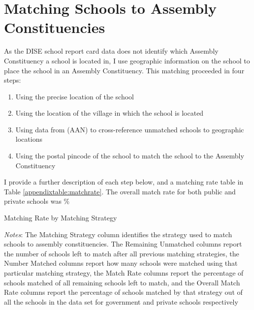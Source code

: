 \documentclass[hidelinks, 12pt, article, oneside]{memoir}
\begin{document}




\clearpage

\section{Matching Schools to Assembly Constituencies}\label{appendixsection:locationmatching}

As the DISE school report card data does not identify which Assembly Constituency a school is located in, I use geographic information on the school to place the school in an Assembly Constituency.  This matching proceeded in four steps:

\begin{enumerate}\itemsep -2pt
    \item Using the precise location of the school
    \item Using the location of the village in which the school is located
    \item Using data from \cite{Adukia2019b} (AAN) to cross-reference unmatched schools to geographic locations
    \item Using the postal pincode of the school to match the school to the Assembly Constituency
\end{enumerate}

I provide a further description of each step below, and a matching rate table in Table \ref{appendixtable:matchrate}.  The overall match rate for both public and private schools was \%

\SingleSpacing
\begin{table}[h]
\begin{threeparttable}
\scriptsize
\caption{Matching Rate by Matching Strategy\label{appendixtable:matchrate}}
\centering

\begin{tablenotes}
    \tiny \item \emph{Notes}: The Matching Strategy column identifies the strategy used to match schools to assembly constituencies.  The Remaining Unmatched columns report the number of schools left to match after all previous matching strategies, the Number Matched columns report how many schools were matched using that particular matching strategy, the Match Rate columns report the percentage of schools matched of all remaining schools left to match, and the Overall Match Rate columns report the percentage of schools matched by that strategy out of all the schools in the data set for government and private schools respectively 
\end{tablenotes}
\end{threeparttable}
\end{table}
\DoubleSpacing
\end{document}
